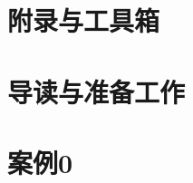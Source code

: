 \documentclass[fontsize=12pt, paper=a4, oneside, DIV=calc]{scrbook}
\theoremstyle{break}
\begin{document}
\chapter{附录与工具箱}


\chapter{导读与准备工作}


\chapter{案例0}





\end{document}
